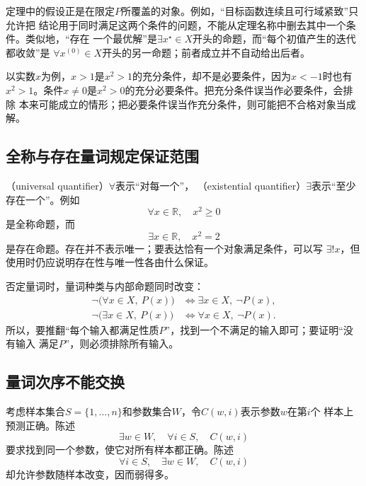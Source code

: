 定理中的假设正是在限定$P$所覆盖的对象。例如，“目标函数连续且可行域紧致”只允许把
结论用于同时满足这两个条件的问题，不能从定理名称中删去其中一个条件。类似地，“存在
一个最优解”是$\exists x^\star\in X$开头的命题，而“每个初值产生的迭代都收敛”是
$\forall x^{(0)}\in X$开头的另一命题；前者成立并不自动给出后者。

以实数$x$为例，$x>1$是$x^2>1$的充分条件，却不是必要条件，因为$x<-1$时也有
$x^2>1$。条件$x\neq0$是$x^2>0$的充分必要条件。把充分条件误当作必要条件，会排除
本来可能成立的情形；把必要条件误当作充分条件，则可能把不合格对象当成解。

\subsection{全称与存在量词规定保证范围}

（universal quantifier）$\forall$表示“对每一个”，
（existential quantifier）$\exists$表示“至少存在一个”。例如
\[
  \forall x\in\mathbb{R},\quad x^2\geq0
\]
是全称命题，而
\[
  \exists x\in\mathbb{R},\quad x^2=2
\]
是存在命题。存在并不表示唯一；要表达恰有一个对象满足条件，可以写
$\exists!x$，但使用时仍应说明存在性与唯一性各由什么保证。

否定量词时，量词种类与内部命题同时改变：
\begin{align*}
  \neg\bigl(\forall x\in X,\ P(x)\bigr)
  &\Longleftrightarrow
  \exists x\in X,\ \neg P(x),\\
  \neg\bigl(\exists x\in X,\ P(x)\bigr)
  &\Longleftrightarrow
  \forall x\in X,\ \neg P(x).
\end{align*}
所以，要推翻“每个输入都满足性质$P$”，找到一个不满足的输入即可；要证明“没有输入
满足$P$”，则必须排除所有输入。

\subsection{量词次序不能交换}

考虑样本集合$S=\{1,\ldots,n\}$和参数集合$W$，令$C(w,i)$表示参数$w$在第$i$个
样本上预测正确。陈述
\begin{equation}
  \exists w\in W,\quad \forall i\in S,\quad C(w,i)
  \label{eq:prelim-one-parameter-all-samples}
\end{equation}
要求找到同一个参数，使它对所有样本都正确。陈述
\begin{equation}
  \forall i\in S,\quad \exists w\in W,\quad C(w,i)
  \label{eq:prelim-each-sample-some-parameter}
\end{equation}
却允许参数随样本改变，因而弱得多。

